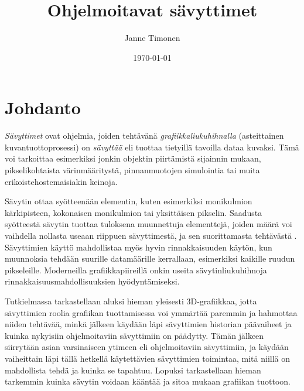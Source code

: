 \documentclass[finnish]{tktltiki2}
\title{Ohjelmoitavat sävyttimet}
\author{Janne Timonen}
\date{\today}
\theoremstyle{definition}
\theoremstyle{remark}
\begin{document}

\frontmatter      %

\maketitle        %
\makeabstract     %

\tableofcontents  %


\mainmatter       %

\section{Johdanto}


\emph{Sävyttimet} ovat ohjelmia, joiden tehtävänä \emph{grafiikkaliukuhihnalla} (asteittainen kuvantuottoprosessi) on \emph{sävyttää} eli tuottaa tietyillä tavoilla dataa kuvaksi. Tämä voi tarkoittaa esimerkiksi jonkin objektin piirtämistä sijainnin mukaan, pikselikohtaista värinmääritystä, pinnanmuotojen simulointia tai muita erikoistehostemaisiakin keinoja. 

Sävytin ottaa syötteenään elementin, kuten esimerkiksi monikulmion kärkipisteen, kokonaisen monikulmion tai yksittäisen pikselin. Saadusta syötteestä sävytin tuottaa tuloksena muunnettuja elementtejä, joiden määrä voi vaihdella nollasta useaan riippuen sävyttimestä, ja sen suorittamasta tehtävästä \cite[s. 500]{Gre14}. Sävyttimien käyttö mahdollistaa myös hyvin rinnakkaisuuden käytön, kun muunnoksia tehdään suurille datamäärille kerrallaan, esimerkiksi kaikille ruudun pikseleille. Moderneilla grafiikkapiireillä onkin useita sävytinliukuhihnoja rinnakkaisuusmahdollisuuksien hyödyntämiseksi.

Tutkielmassa tarkastellaan aluksi hieman yleisesti 3D-grafiikkaa, jotta sävyttimien roolia grafiikan tuottamisessa voi ymmärtää paremmin ja hahmottaa niiden tehtävää, minkä jälkeen käydään läpi sävyttimien historian päävaiheet ja kuinka nykyisiin ohjelmoitaviin sävyttimiin on päädytty. Tämän jälkeen siirrytään asian varsinaiseen ytimeen eli ohjelmoitaviin sävyttimiin, ja käydään vaiheittain läpi tällä hetkellä käytettävien sävyttimien toimintaa, mitä niillä on mahdollista tehdä ja kuinka se tapahtuu. Lopuksi tarkastellaan hieman tarkemmin kuinka sävytin voidaan kääntää ja sitoa mukaan grafiikan tuottoon.
\end{document}
